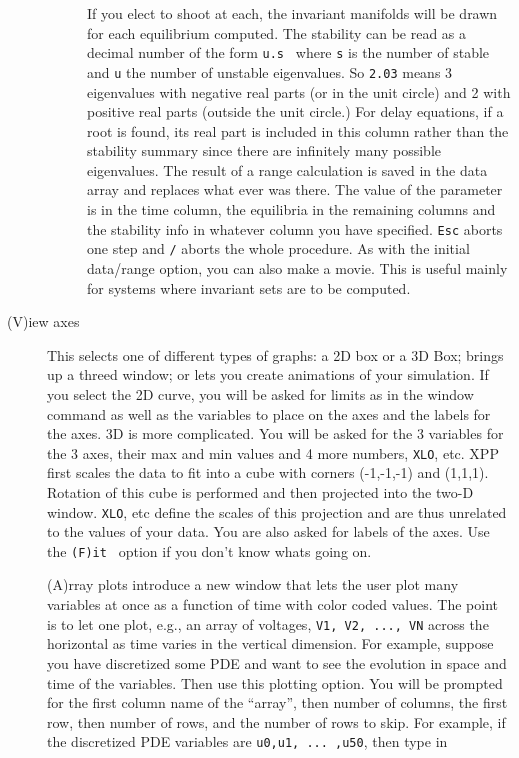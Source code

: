 \documentclass{article}
\newcommand{\tc}[1]{\addcontentsline{toc}{subsection}{#1}}
\begin{document}
\begin{description}
\begin{description}
If you elect to shoot at each, the invariant
manifolds will be drawn for each equilibrium computed.  The stability can be
read as a decimal number of the form {\tt  u.s } where {\tt s}  is the
number of stable and {\tt u}
 the number of unstable eigenvalues. So {\tt 2.03} means 3 eigenvalues
with negative real parts (or in the unit circle) and 2 with positive
real parts (outside the unit circle.)
For delay equations, if a root is found, its real part is included in
this column rather than the stability summary since there are
infinitely many possible eigenvalues.
The result of a range calculation is saved
in the data array and replaces what ever was there.  The value of the parameter
 is in the time column, the equilibria in the remaining columns and the
stability info in whatever column you have specified.
 {\tt Esc} aborts one step and
{\tt /}  aborts the whole procedure. As with the initial data/range
option, you can also make a movie.  This is useful mainly for systems
where invariant sets are to be computed.
\end{description}
\tc{Axes}\item[(V)iew axes]  This selects one of  different types of graphs:
a 2D box or a 3D Box; brings up a threed window; or lets you create
animations of your simulation.
If you select the 2D curve, you will be asked for limits
as in the window command as well as the variables to place on the axes
and the labels for the axes.
3D is more complicated.  You will be asked for the 3 variables for the 3 axes,
their max and min values and 4 more numbers, {\tt XLO},  etc.  XPP first scales the
data to fit into a cube with corners (-1,-1,-1) and (1,1,1).  Rotation of this
 cube is performed and then projected into the two-D window.  {\tt XLO}, etc define
 the scales of this projection and are thus unrelated to the values of your
data.  You are also asked for labels of the axes.
Use the {\tt (F)it } option if you don't know whats going on.
\tc{Space-time plots} (A)rray plots introduce a new window that lets the user plot many
variables at once as a function of time with color coded values.  The
point is to let one plot, e.g., an array of voltages, {\tt V1, V2,
..., VN} across the horizontal as time varies in the vertical
dimension. For example, suppose you have discretized some PDE and want
to see the evolution in space and time of the variables.  Then use
this plotting option. You will be prompted for the first column name
of the ``array'', then number of columns, the first row, then number
of rows, and the number of rows to skip. For example, if the
discretized PDE variables are {\tt u0,u1, ... ,u50}, then type in {\tt
}
\end{description}
\end{document}
